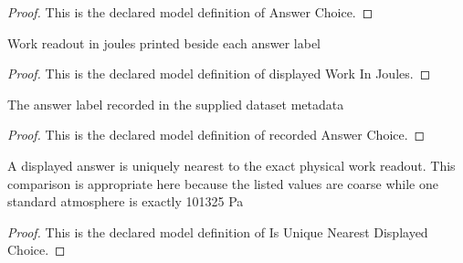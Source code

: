 \begin{proof}
  This is the declared model definition of Answer Choice.
\end{proof}
\begin{definition}
  \label{def:physics:phyx-mini-0417:phyxminiproblems-problemphyxmini0417-displayedworkinjoules}
  Work readout in joules printed beside each answer label
\end{definition}
\begin{proof}
  This is the declared model definition of displayed Work In Joules.
\end{proof}
\begin{definition}
  \label{def:physics:phyx-mini-0417:phyxminiproblems-problemphyxmini0417-recordedanswerchoice}
  The answer label recorded in the supplied dataset metadata
\end{definition}
\begin{proof}
  This is the declared model definition of recorded Answer Choice.
\end{proof}
\begin{definition}
  \label{def:physics:phyx-mini-0417:phyxminiproblems-problemphyxmini0417-isuniquenearestdisplayedchoice}
  A displayed answer is uniquely nearest to the exact physical work readout. This comparison is appropriate here because the listed values are coarse while one standard atmosphere is exactly 101325 Pa
\end{definition}
\begin{proof}
  This is the declared model definition of Is Unique Nearest Displayed Choice.
\end{proof}
